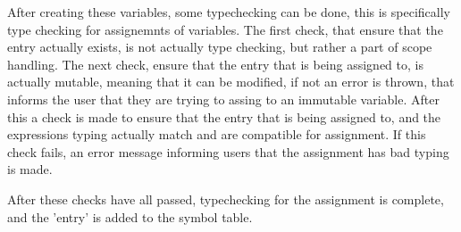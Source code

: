 After creating these variables, some typechecking can be done, this is specifically type checking for assignemnts of variables. The first check, that ensure that the entry actually exists, is not actually type checking, but rather a part of scope handling. The next check, ensure that the entry that is being assigned to, is actually mutable, meaning that it can be modified, if not an error is thrown, that informs the user that they are trying to assing to an immutable variable. After this a check is made to ensure that the entry that is being assigned to, and the expressions typing actually match and are compatible for assignment. If this check fails, an error message informing users that the assignment has bad typing is made.

After these checks have all passed, typechecking for the assignment is complete, and the 'entry' is added to the symbol table.